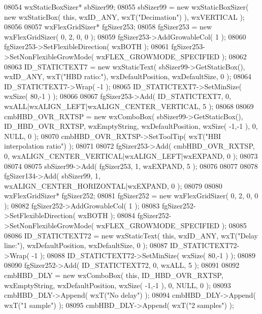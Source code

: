 \begin{DoxyCode}
08054     wxStaticBoxSizer* sbSizer99;
08055     sbSizer99 = \textcolor{keyword}{new} wxStaticBoxSizer( \textcolor{keyword}{new} wxStaticBox( \textcolor{keyword}{this}, wxID\_ANY, wxT(\textcolor{stringliteral}{"Decimation"}) ), wxVERTICAL );
08056     
08057     wxFlexGridSizer* fgSizer253;
08058     fgSizer253 = \textcolor{keyword}{new} wxFlexGridSizer( 0, 2, 0, 0 );
08059     fgSizer253->AddGrowableCol( 1 );
08060     fgSizer253->SetFlexibleDirection( wxBOTH );
08061     fgSizer253->SetNonFlexibleGrowMode( wxFLEX\_GROWMODE\_SPECIFIED );
08062     
08063     ID_STATICTEXT7 = \textcolor{keyword}{new} wxStaticText( sbSizer99->GetStaticBox(), wxID\_ANY, wxT(\textcolor{stringliteral}{"HBD ratio:"}), 
      wxDefaultPosition, wxDefaultSize, 0 );
08064     ID_STATICTEXT7->Wrap( -1 );
08065     ID_STATICTEXT7->SetMinSize( wxSize( 80,-1 ) );
08066     
08067     fgSizer253->Add( ID_STATICTEXT7, 0, wxALL|wxALIGN\_LEFT|wxALIGN\_CENTER\_VERTICAL, 5 );
08068     
08069     cmbHBD_OVR_RXTSP = \textcolor{keyword}{new} wxComboBox( sbSizer99->GetStaticBox(), 
      ID_HBD_OVR_RXTSP, wxEmptyString, wxDefaultPosition, wxSize( -1,-1 ), 0, NULL, 0 ); 
08070     cmbHBD_OVR_RXTSP->SetToolTip( wxT(\textcolor{stringliteral}{"HBI interpolation ratio"}) );
08071     
08072     fgSizer253->Add( cmbHBD_OVR_RXTSP, 0, wxALIGN\_CENTER\_VERTICAL|wxALIGN\_LEFT|wxEXPAND, 0 );
08073     
08074     
08075     sbSizer99->Add( fgSizer253, 1, wxEXPAND, 5 );
08076     
08077     
08078     fgSizer134->Add( sbSizer99, 1, wxALIGN\_CENTER\_HORIZONTAL|wxEXPAND, 0 );
08079     
08080     wxFlexGridSizer* fgSizer252;
08081     fgSizer252 = \textcolor{keyword}{new} wxFlexGridSizer( 0, 2, 0, 0 );
08082     fgSizer252->AddGrowableCol( 1 );
08083     fgSizer252->SetFlexibleDirection( wxBOTH );
08084     fgSizer252->SetNonFlexibleGrowMode( wxFLEX\_GROWMODE\_SPECIFIED );
08085     
08086     ID_STATICTEXT72 = \textcolor{keyword}{new} wxStaticText( \textcolor{keyword}{this}, wxID\_ANY, wxT(\textcolor{stringliteral}{"Delay line:"}), wxDefaultPosition, 
      wxDefaultSize, 0 );
08087     ID_STATICTEXT72->Wrap( -1 );
08088     ID_STATICTEXT72->SetMinSize( wxSize( 80,-1 ) );
08089     
08090     fgSizer252->Add( ID_STATICTEXT72, 0, wxALL, 5 );
08091     
08092     cmbHBD_DLY = \textcolor{keyword}{new} wxComboBox( \textcolor{keyword}{this}, ID_HBD_OVR_RXTSP, wxEmptyString, wxDefaultPosition, wxSize( -1,-1 ),
       0, NULL, 0 );
08093     cmbHBD_DLY->Append( wxT(\textcolor{stringliteral}{"No delay"}) );
08094     cmbHBD_DLY->Append( wxT(\textcolor{stringliteral}{"1 sample"}) );
08095     cmbHBD_DLY->Append( wxT(\textcolor{stringliteral}{"2 samples"}) );

\end{DoxyCode}
